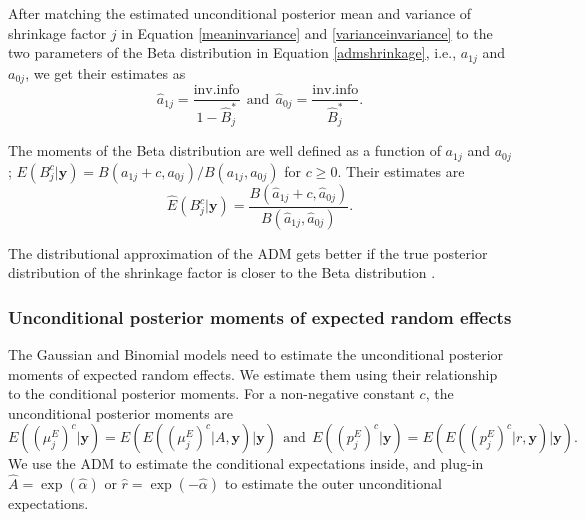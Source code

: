 \documentclass[article]{jss}
\begin{document}
After matching the estimated unconditional posterior mean and variance of shrinkage factor $j$ in Equation \ref{meaninvariance} and \ref{varianceinvariance} to the two parameters of the Beta distribution in Equation \ref{admshrinkage}, i.e., $a_{1j}$ and $a_{0j}$, we get their estimates as
\begin{equation}\label{admpara}
\hat{a}_{1j}=\frac{\textrm{inv.info}}{1-\hat{B}^\ast_j}~~\textrm{and}~~\hat{a}_{0j}=\frac{\textrm{inv.info}}{\hat{B}^\ast_j}.
\end{equation}

The moments of the Beta distribution are well defined as a function of $a_{1j}$ and $a_{0j}$; $E(B^c_j\vert\boldsymbol{y})=B(a_{1j} + c, a_{0j})/B(a_{1j}, a_{0j})$ for $c\ge0$. Their estimates are 
\begin{equation}\label{shrinkagemoments}
\widehat{E}(B^c_j\vert\boldsymbol{y})= \frac{B(\hat{a}_{1j} + c, \hat{a}_{0j})}{B(\hat{a}_{1j}, \hat{a}_{0j})}.
\end{equation}

The distributional approximation of the ADM gets better if the true posterior distribution of the shrinkage factor is closer to the Beta distribution \citep{morris1997, tang2011, morris2012}.




\subsubsection{Unconditional posterior moments of expected random effects}
The Gaussian and Binomial models need to estimate the unconditional posterior moments of expected random effects. We estimate them using their relationship to the conditional posterior moments. For a non-negative constant $c$, the unconditional posterior moments are
\begin{equation}
E((\mu^E_j)^c\vert\boldsymbol{y})=E(E((\mu^E_j)^c\vert A, \boldsymbol{y})\vert\boldsymbol{y})~~\textrm{and}~~E((p^E_j)^c\vert\boldsymbol{y})=E(E((p^E_j)^c\vert r, \boldsymbol{y})\vert\boldsymbol{y}).
\end{equation}
We use the ADM to estimate the conditional expectations inside, and plug-in $\hat{A}=\exp(\hat{\alpha})$ or $\hat{r}=\exp(-\hat{\alpha})$ to estimate the outer unconditional expectations.
\end{document}
